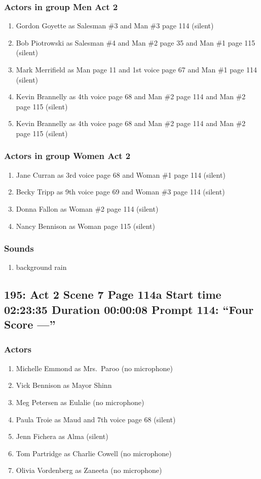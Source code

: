 \subsubsection{Actors in group Men Act 2}
\begin{enumerate}
\item Gordon Goyette as Salesman \#3 and Man \#3 page 114 (silent)
\item Bob Piotrowski as Salesman \#4 and Man \#2 page 35 and Man \#1 page 115 (silent)
\item Mark Merrifield as Man page 11 and 1st voice page 67 and Man \#1 page 114 (silent)
\item Kevin Brannelly as 4th voice page 68 and Man \#2 page 114 and Man \#2 page 115 (silent)
\item Kevin Brannelly as 4th voice page 68 and Man \#2 page 114 and Man \#2 page 115 (silent)
\end{enumerate}
\subsubsection{Actors in group Women Act 2}
\begin{enumerate}
\item Jane Curran as 3rd voice page 68 and Woman \#1 page 114 (silent)
\item Becky Tripp as 9th voice page 69 and Woman \#3 page 114 (silent)
\item Donna Fallon as Woman \#2 page 114 (silent)
\item Nancy Bennison as Woman page 115 (silent)
\end{enumerate}

\subsubsection{Sounds}
\begin{enumerate}
\item background rain
\end{enumerate}
\subsection{195: Act 2 Scene 7 Page 114a Start time 02:23:35 Duration 00:00:08 Prompt 114: ``Four Score ---''}

\subsubsection{Actors}
\begin{enumerate}
\item Michelle Emmond as Mrs.~Paroo (no microphone)
\item Vick Bennison as Mayor Shinn
\item Meg Petersen as Eulalie (no microphone)
\item Paula Troie as Maud and 7th voice page 68 (silent)
\item Jenn Fichera as Alma (silent)
\item Tom Partridge as Charlie Cowell (no microphone)
\item Olivia Vordenberg as Zaneeta (no microphone)
\end{enumerate}
